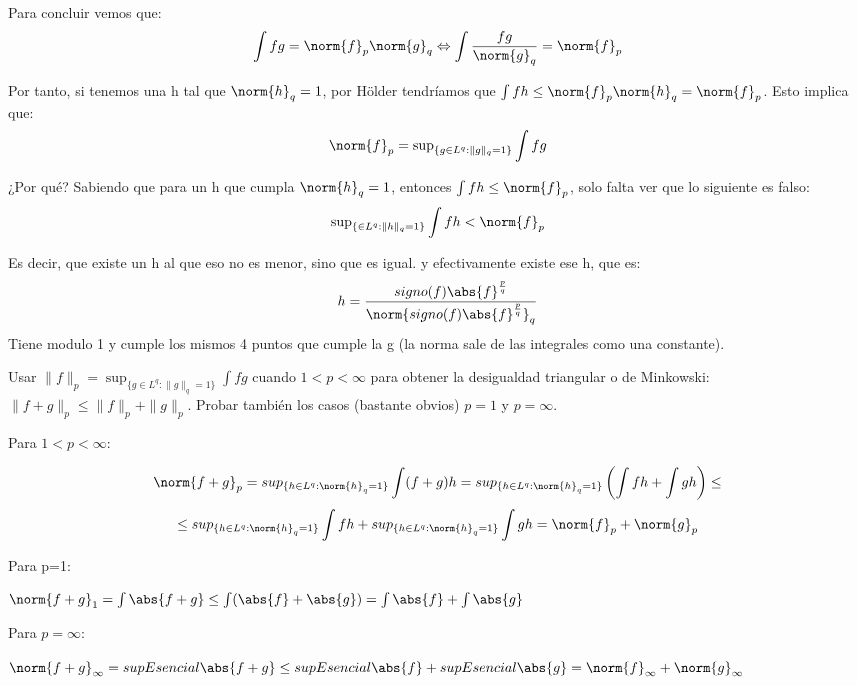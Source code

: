 \begin{problem}[4]
Para concluir vemos que:
\[
\int fg = \norm{f}_p \norm{g}_q  \Leftrightarrow \int \frac{fg}{\norm{g}_q} = \norm{f}_p 
\]

Por tanto, si tenemos una h tal que $\norm{h}_q = 1$, por Hölder tendríamos que $\int fh \leq \norm{f}_p \norm{h}_q = \norm{f}_p$. Esto implica que:
\[
\norm{f}_p =  \operatorname{sup}_{\{g\in L^q: \|g\|_q=1\}} \int fg
\]

¿Por qué? Sabiendo que para un h que cumpla $\norm{h}_q = 1$, entonces $\int fh \leq \norm{f}_p$, solo falta ver que lo siguiente es falso:
\[
 \operatorname{sup}_{\{\in L^q: \|h\|_q=1\}} \int fh < \norm{f}_p
\]

Es decir, que existe un h al que eso no es menor, sino que es igual. y efectivamente existe ese h, que es:
\[
h = \frac{signo(f)\abs{f}^\frac{p}{q}}{\norm{signo(f)\abs{f}^\frac{p}{q}}_q}
\]
Tiene modulo 1 y cumple los mismos 4 puntos que cumple la g (la norma sale  de las integrales como una constante).

\end{problem}


\begin{problem}[5] Usar $\|f\|_p= \operatorname{sup}_{\{g\in L^q: \|g\|_q=1\}} \int fg $ cuando $1 < p <  \infty$
para obtener la desigualdad triangular o de Minkowski: $\|f + g\|_p \le \|f\|_p + \|g\|_p$.
Probar tambi\'en los casos (bastante obvios) $p=1$  y  $p = \infty$.
\solution

\begin{expla}

\end{expla}
Para $1<p<\infty$:

\[
\norm{f+g}_p = sup_{\{h\in L^q: \norm{h}_q=1\}}\int (f+g)h =  sup_{\{h\in L^q: \norm{h}_q=1\}}\left(\int fh + \int gh\right) \leq 
\]
\[
\leq sup_{\{h\in L^q: \norm{h}_q=1\}}\int fh +  sup_{\{h\in L^q: \norm{h}_q=1\}} \int gh = \norm{f}_p + \norm{g}_p   
\]

Para p=1:

$\norm{f+g}_1 = \int \abs{f+g} \leq \int (\abs{f} + \abs{g})=  \int \abs{f} + \int \abs{g}$

Para $p=\infty$:

$\norm{f+g}_{\infty} = supEsencial\abs{f+g} \leq supEsencial\abs{f} + supEsencial\abs{g} = \norm{f}_{\infty} + \norm{g}_{\infty}$
\end{problem}

